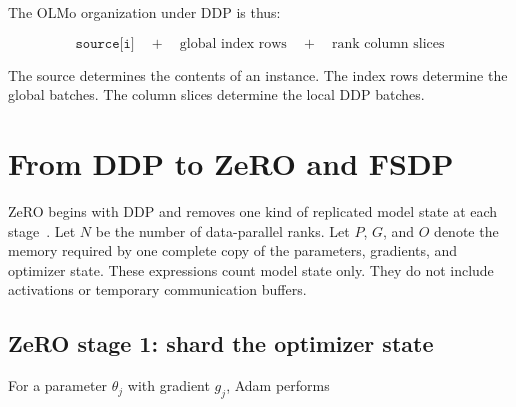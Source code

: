 \documentclass[11pt]{article}
\begin{document}
The OLMo organization under DDP is thus:

\[
\boxed{
\texttt{source[i]}
\quad+\quad
\text{global index rows}
\quad+\quad
\text{rank column slices}
}
\]

The source determines the contents of an instance. The index rows determine
the global batches. The column slices determine the local DDP batches.

\newpage
\section{From DDP to ZeRO and FSDP}

ZeRO begins with DDP and removes one kind of replicated model state at each
stage~\cite{rajbhandari2020zero}. Let \(N\) be the number of data-parallel
ranks. Let \(P\), \(G\), and \(O\) denote the memory required by one complete
copy of the parameters, gradients, and optimizer state. These expressions
count model state only. They do not include activations or temporary
communication buffers.

\begin{center}
\end{center}

\subsection{ZeRO stage 1: shard the optimizer state}

For a parameter \(\theta_j\) with gradient \(g_j\), Adam performs
\end{document}

